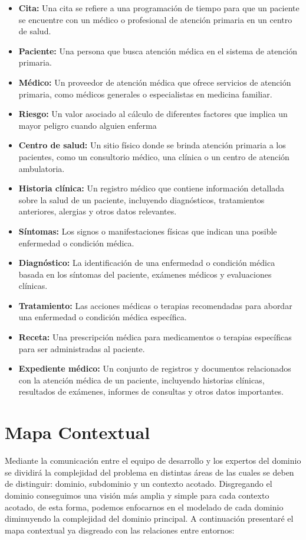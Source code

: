 \begin{itemize}
\item \textbf{Cita:} Una cita se refiere a una programación de tiempo para que un paciente se encuentre con un médico o profesional de atención primaria en un centro de salud.
\item \textbf{Paciente:} Una persona que busca atención médica en el sistema de atención primaria.
\item \textbf{Médico:} Un proveedor de atención médica que ofrece servicios de atención primaria, como médicos generales o especialistas en medicina familiar.
\item \textbf{Riesgo:} Un valor asociado al cálculo de diferentes factores que implica un mayor peligro cuando alguien enferma
\item \textbf{Centro de salud:} Un sitio físico donde se brinda atención primaria a los pacientes, como un consultorio médico, una clínica o un centro de atención ambulatoria.
\item \textbf{Historia clínica:} Un registro médico que contiene información detallada sobre la salud de un paciente, incluyendo diagnósticos, tratamientos anteriores, alergias y otros datos relevantes.
\item \textbf{Síntomas:} Los signos o manifestaciones físicas que indican una posible enfermedad o condición médica.
\item \textbf{Diagnóstico:} La identificación de una enfermedad o condición médica basada en los síntomas del paciente, exámenes médicos y evaluaciones clínicas.
\item \textbf{Tratamiento:} Las acciones médicas o terapias recomendadas para abordar una enfermedad o condición médica específica.
\item \textbf{Receta:} Una prescripción médica para medicamentos o terapias específicas para ser administradas al paciente.
\item \textbf{Expediente médico:} Un conjunto de registros y documentos relacionados con la atención médica de un paciente, incluyendo historias clínicas, resultados de exámenes, informes de consultas y otros datos importantes.
\end{itemize}

\section{Mapa Contextual}
Mediante la comunicación entre el equipo de desarrollo y los expertos del dominio se dividirá la complejidad del problema
en distintas áreas de las cuales se deben de distinguir: dominio, subdominio y un contexto acotado. Disgregando el dominio 
conseguimos una visión más amplia y simple para cada contexto acotado, de esta forma, podemos enfocarnos en el modelado de
cada dominio diminuyendo la complejidad del dominio principal. A continuación presentaré el mapa contextual ya disgreado con 
las relaciones entre entornos:


